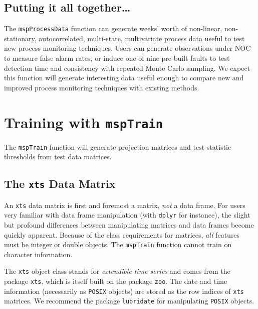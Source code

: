 \documentclass{report}\usepackage[]{graphicx}\usepackage[]{color}
\begin{document}
\subsection{Putting it all together\ldots}
The \texttt{mspProcessData} function can generate weeks' worth of non-linear, non-stationary, autocorrelated, multi-state, multivariate process data useful to test new process monitoring techniques. Users can generate observations under NOC to measure false alarm rates, or induce one of nine pre-built faults to test detection time and consistency with repeated Monte Carlo sampling. We expect this function will generate interesting data useful enough to compare new and improved process monitoring techniques with existing methods.




\section{Training with \texttt{mspTrain}}

The \texttt{mspTrain} function will generate projection matrices and test statistic thresholds from test data matrices.


\subsection{The \texttt{xts} Data Matrix}
An \texttt{xts} data matrix is first and foremost a matrix, \emph{not} a data frame. For users very familiar with data frame manipulation (with \texttt{dplyr} for instance), the slight but profound differences between manipulating matrices and data frames become quickly apparent. Because of the class requirements for matrices, \emph{all} features must be integer or double objects. The \texttt{mspTrain} function cannot train on character information.

The \texttt{xts} object class stands for \emph{extendible time series} and comes from the package \texttt{xts}, which is itself built on the package \texttt{zoo}. The date and time information (necessarily as \texttt{POSIX} objects) are stored as the row indices of \texttt{xts} matrices. We recommend the package \texttt{lubridate} for manipulating \texttt{POSIX} objects.
\end{document}
